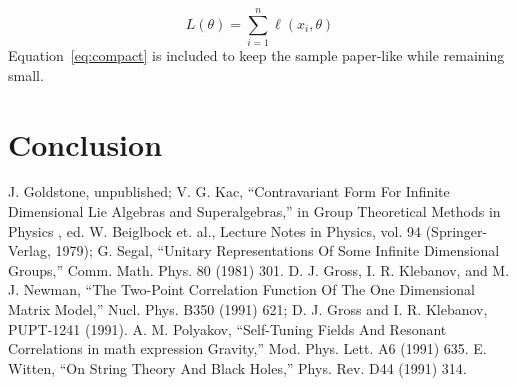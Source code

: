 \documentclass[11pt]{article}
\begin{document}
\begin{equation}
\label{eq:compact}
L(\theta) = \sum_{i=1}^{n} \ell(x_i, \theta)
\end{equation}
Equation~\ref{eq:compact} is included to keep the sample paper-like while remaining small.

\section{Conclusion}

J. Goldstone, unpublished; V. G. Kac, ``Contravariant Form For Infinite Dimensional Lie Algebras and Superalgebras,'' in Group Theoretical Methods in Physics , ed. W. Beiglbock et. al., Lecture Notes in Physics, vol. 94 (Springer-Verlag, 1979); G. Segal, ``Unitary Representations Of Some Infinite Dimensional Groups,'' Comm. Math. Phys. 80 (1981) 301. D. J. Gross, I. R. Klebanov, and M. J. Newman, ``The Two-Point Correlation Function Of The One Dimensional Matrix Model,'' Nucl. Phys. B350 (1991) 621; D. J. Gross and I. R. Klebanov, PUPT-1241 (1991). A. M. Polyakov, ``Self-Tuning Fields And Resonant Correlations in math expression Gravity,'' Mod. Phys. Lett. A6 (1991) 635. E. Witten, ``On String Theory And Black Holes,'' Phys. Rev. D44 (1991) 314.
\end{document}
